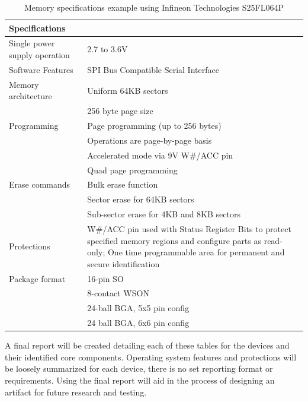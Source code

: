 \begin{table}
  \centering
  \label{fig:memory_specs}%
  \caption{Memory specifications example using Infineon Technologies S25FL064P \autocite{S25FL064PSeriesFlash}}
  \begin{tabular}{|p{4cm}|p{12cm}|}
    \hline\rowcolor{gray!30}

    \textbf{Specifications} &  \\
    \hline

    Single power supply operation & 2.7 to 3.6V \\
    \hline

    Software Features & SPI Bus Compatible Serial Interface \\
    \hline

    Memory architecture & Uniform 64KB sectors \\
    & 256 byte page size \\
    \hline

    Programming & Page programming (up to 256 bytes) \\
    & Operations are page-by-page basis \\
    & Accelerated mode via 9V W\#/ACC pin \\
    & Quad page programming \\
    \hline

    Erase commands & Bulk erase function \\
     & Sector erase for 64KB sectors \\
     & Sub-sector erase for 4KB and 8KB sectors \\
    \hline

    Protections & W\#/ACC pin used with Status Register Bits to protect specified memory regions and configure parts as read-only; One time programmable area for permanent and secure identification \\
    \hline

    Package format & 16-pin SO \\
    & 8-contact WSON \\
    & 24-ball BGA, 5x5 pin config \\
    & 24 ball BGA, 6x6 pin config \\
    \hline

  \end{tabular}
\end{table}

A final report will be created detailing each of these tables for the devices and their identified core components. Operating system features and protections will be loosely summarized for each device, there is no set reporting format or requirements. Using the final report will aid in the process of designing an artifact for future research and testing.

